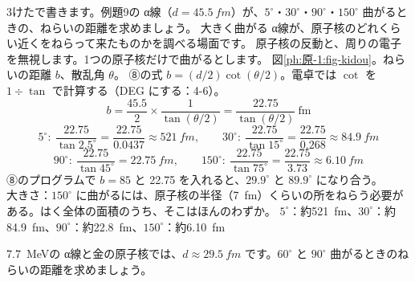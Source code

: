 \label{ph:原-1:ex10}
\begin{phreidai}
3けたで書きます。例題9の α線（$d=\qty{45.5}{fm}$）が、$5^\circ$・$30^\circ$・$90^\circ$・$150^\circ$ 曲がるときの、ねらいの距離を求めましょう。
\phbamen
大きく曲がる α線が、原子核のどれくらい近くをねらって来たものかを調べる場面です。
\phmushi
原子核の反動と、周りの電子を無視します。1つの原子核だけで曲がるとします。
\phzu
図\ref{ph:原-1:fig-kidou}。ねらいの距離 $b$、散乱角 $\theta$。
\phriyu
⑧の式 $b=(d/2)\cot(\theta/2)$。電卓では $\cot$ を $1\div\tan$ で計算する（DEG にする：4-6）。
\phtateru
\[ b=\frac{45.5}{2}\times\frac{1}{\tan(\theta/2)}=\frac{22.75}{\tan(\theta/2)}\ \mathrm{fm} \]
\phtoku
\[ 5^\circ:\ \frac{22.75}{\tan2.5^\circ}=\frac{22.75}{0.0437}\approx\qty{521}{fm},\qquad 30^\circ:\ \frac{22.75}{\tan15^\circ}=\frac{22.75}{0.268}\approx\qty{84.9}{fm} \]
\[ 90^\circ:\ \frac{22.75}{\tan45^\circ}=\qty{22.75}{fm},\qquad 150^\circ:\ \frac{22.75}{\tan75^\circ}=\frac{22.75}{3.73}\approx\qty{6.10}{fm} \]
\phtashikame
⑧のプログラムで $b=85$ と 22.75 を入れると、$29.9^\circ$ と $89.9^\circ$ になり合う。\\
大きさ：$150^\circ$ に曲がるには、原子核の半径（\qty{7}{fm}）くらいの所をねらう必要がある。はく全体の面積のうち、そこはほんのわずか。
\kotae $5^\circ$：約\qty{521}{fm}、$30^\circ$：約\qty{84.9}{fm}、$90^\circ$：約\qty{22.8}{fm}、$150^\circ$：約\qty{6.10}{fm}
\end{phreidai}
\begin{jibun}
\qty{7.7}{MeV}の α線と金の原子核では、$d\approx\qty{29.5}{fm}$ です。$60^\circ$ と $90^\circ$ 曲がるときのねらいの距離を求めましょう。
\end{jibun}

